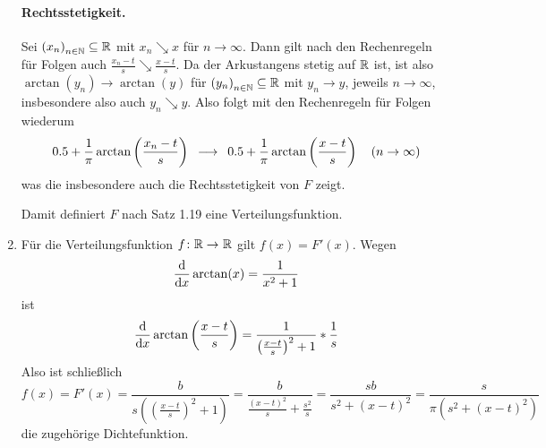 \begin{exercisePage}
\begin{enumerate}[leftmargin=*, label=(\alph*)]
        \paragraph{Rechtsstetigkeit.} Sei $\folge{x_n} \subseteq \R$ mit $x_n \searrow x$ für $n \to \infty$. Dann gilt nach den Rechenregeln für Folgen auch $\frac{x_n - t}{s} \searrow \frac{x - t}{s}$. Da der Arkustangens stetig auf $\mathbb{R}$ ist, ist also $\arctan(y_n) \to \arctan(y)$ für $\folge{y_n} \subseteq \R$ mit $y_n \to y$, jeweils $n \to \infty$, insbesondere also auch $y_n \searrow y$. Also folgt mit den Rechenregeln für Folgen wiederum
        \begin{equation*}
        0.5 + \frac{1}{\pi} \arctan \left( \frac{x_n-t}{s} \right) \enskip \longrightarrow \enskip 0.5 + \frac{1}{\pi} \arctan \left( \frac{x-t}{s} \right) \quad (n \to \infty)
        \end{equation*}
        was die insbesondere auch die Rechtsstetigkeit von $F$ zeigt. 
        
        Damit definiert $F$ nach Satz 1.19 eine Verteilungsfunktion.
        \item Für die Verteilungsfunktion $\abb{f}{\R}{\R}$ gilt $f(x) = F'(x)$. Wegen
        \begin{equation*}
            \frac{\mathrm{d}}{\mathrm{d} x } \arctan(x) = \frac{1}{x^2 + 1}
        \end{equation*}
        ist
        \begin{equation*}
            \frac{\mathrm{d}}{\mathrm{d} x } \arctan\left(\frac{x-t}{s}\right) = \frac{1}{\left(\frac{x-t}{s}\right)^2 + 1} * \frac{1}{s}
        \end{equation*}
        Also ist schließlich
        \begin{equation*}
            f(x) = F'(x) = \frac{b}{s \left( \left( \frac{x-t}{s} \right)^2 + 1 \right)}
            = \frac{b}{\frac{(x-t)^2}{s} + \frac{s^2}{s}} 
            = \frac{sb}{s^2 + (x-t)^2} 
            = \frac{s}{\pi \left( s^2 + (x-t)^2 \right)}
        \end{equation*}
        die zugehörige Dichtefunktion.
    \end{enumerate}
    
\end{exercisePage}